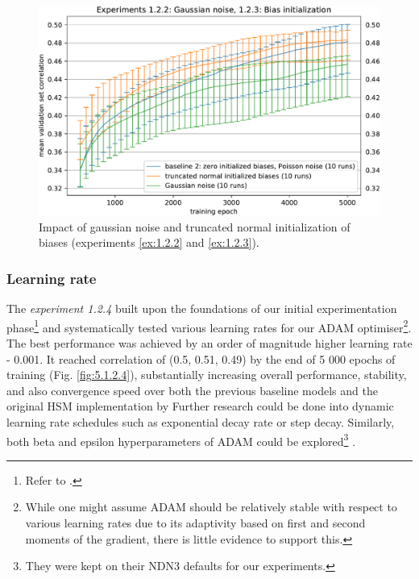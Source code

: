 \begin{figure}[H]
    \centering
    \includegraphics[width=1\textwidth]{../figures/05_1_2_2}
    \caption[Experiments 1.2.2 and 1.2.3]{Impact of gaussian noise and truncated normal initialization of biases (experiments \ref{ex:1.2.2} and \ref{ex:1.2.3}).}
    \label{fig:5.1.2.2}
\end{figure}

\subsubsection{Learning rate}\label{ex:1.2.4}

The \emph{experiment 1.2.4} built upon the foundations of our initial experimentation phase\footnote{Refer to .} and systematically tested various learning rates for our ADAM optimiser\footnote{While one might assume ADAM should be relatively stable with respect to various learning rates due to its adaptivity based on first and second moments of the gradient, there is little evidence to support this.}. The best performance was achieved by an order of magnitude higher learning rate - 0.001. It reached correlation of (0.5, 0.51, 0.49) by the end of 5 000 epochs of training (Fig. \ref{fig:5.1.2.4}), substantially increasing overall performance, stability, and also convergence speed over both the previous baseline models and the original HSM implementation by \citeauthor{antolik} Further research could be done into dynamic learning rate schedules such as exponential decay rate or step decay. Similarly, both beta and epsilon hyperparameters of ADAM could be explored\footnote{They were kept on their NDN3 defaults for our experiments.} \citep{2019arXiv191005446C}.



